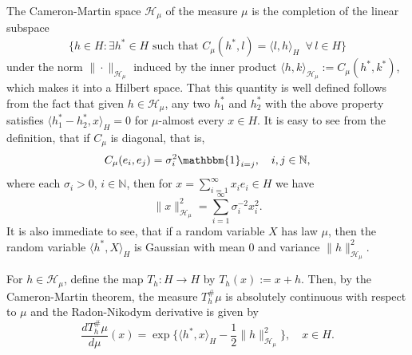 \documentclass[11pt,a4paper]{article}
\renewcommand{\H}{\mathcal{H}}
\newcommand{\I}{\mathbbm{1}}
\newcommand{\N}{\mathbb{N}}
\newcommand{\CM}{\H_\mu}
\numberwithin{equation}{section}
\theoremstyle{definition}
\theoremstyle{remark}
\theoremstyle{plain}
\begin{document}
The Cameron-Martin space $\H_\mu$ of the measure $\mu$ is the completion of the linear subspace
    \begin{equation*}
        \{h \in H:\exists h^*\in H \,\,\text{such that } C_\mu(h^*,l)=\langle l,h\rangle_H \,\,\, \forall \, l \in H\}
    \end{equation*}
under the norm $\|\cdot\|_{\CM}$ induced by the inner product $\langle h,k\rangle_{\CM}:= C_\mu(h^*,k^*)$, which makes it into a Hilbert space.
That this quantity is well defined follows from the fact that given $h\in \H_\mu$, any two $h_1^*$ and $h_2^*$ with the above property satisfies $\langle h_1^*-h_2^*,x\rangle_H=0$ for $\mu$-almost every $x\in H$. It is easy to see from the definition, that if $C_\mu$ is diagonal, that is, 
\begin{equation*}
C_\mu(e_i,e_j)=\sigma_i^2 \I_{i=j},\quad i,j\in \N,
\end{equation*}
where each $\sigma_i>0$, $i\in\N$, then for $x=\sum_{i=1}^\infty x_ie_i\in H$ we have
\begin{equation}\label{hmunorm}
\|x\|_{\CM}^2=\sum_{i=1}^\infty \sigma_i^{-2}x_i^2.
\end{equation}
It is also immediate to see, that if a random variable $X$ has law $\mu$, then the  random variable $\langle h^*, X\rangle_H$ is Gaussian with mean $0$ and variance $\|h\|^2_{\CM}$.

 
For $h\in \H_\mu$, define the map $T_h: H\to H$ by $T_h(x):=x+h$. Then, by the Cameron-Martin theorem, the measure $T_h^\# \mu$ is absolutely continuous with respect to $\mu$ and the Radon-Nikodym derivative is given by 
\begin{equation}\label{eq:R-N}
\frac{d T_h^\# \mu}{d \mu}(x)=\exp\Big\{\langle h^*,x\rangle_H-\frac{1}{2}\|h\|_{\CM}^2\Big\},\quad x\in H.
\end{equation}
\end{document}
